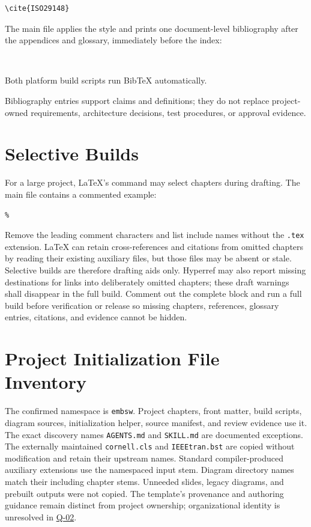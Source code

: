\begin{verbatim}
\cite{ISO29148}
\end{verbatim}

The main file applies the style and prints one document-level bibliography after the appendices and glossary, immediately before the index:

\begin{verbatim}


\end{verbatim}

Both platform build scripts run BibTeX automatically.

Bibliography entries support claims and definitions; they do not replace
project-owned requirements, architecture decisions, test procedures, or
approval evidence.

\section{Selective Builds}

For a large project, LaTeX's \verb|| command may select chapters
during drafting. The main file contains a commented example:

\begin{verbatim}
% 
\end{verbatim}

Remove the leading comment characters and list include names without the
\texttt{.tex} extension. LaTeX can retain cross-references and citations from
omitted chapters by reading their existing auxiliary files, but those files
may be absent or stale. Selective builds are therefore drafting aids only.
Hyperref may also report missing destinations for links into deliberately
omitted chapters; these draft warnings shall disappear in the full build.
Comment out the complete \verb|| block and run a full build before
verification or release so missing chapters, references, glossary entries,
citations, and evidence cannot be hidden.

\section{Project Initialization File Inventory}
\label{Section:ProjectFileInventory}
The confirmed namespace is \texttt{embsw}. Project chapters, front matter,
build scripts, diagram sources, initialization helper, source manifest, and
review evidence use it. The exact discovery names \texttt{AGENTS.md} and
\texttt{SKILL.md} are documented exceptions. The externally maintained
\texttt{cornell.cls} and \texttt{IEEEtran.bst} are copied without modification
and retain their upstream names. Standard compiler-produced auxiliary extensions
use the namespaced input stem. Diagram directory names match their including
chapter stems. Unneeded slides, legacy diagrams, and prebuilt outputs were not copied.
The template's provenance and authoring guidance remain distinct from project
ownership; organizational identity is unresolved in \hyperref[Question:Q-02]{Q-02}.
